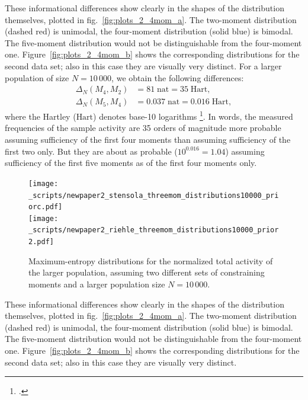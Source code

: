 \documentclass[\ifafour a4paper,12pt,\else a5paper,10pt,\fi%
onecolumn,oneside,article,%
british%
]{memoir}
\theoremstyle{remark}
\theoremstyle{innote}
\newcommand*{\citep}{\footcites}
\renewcommand*{\|}{\nonscript\,\vert\nonscript\;\mathopen{}}
\newcommand*{\sect}{\S}%
\newcommand*{\fig}{fig.}%
\newcommand*{\ydi}{\varDelta}
\newcommand*{\nat}{\textrm{nat}}
\newcommand*{\hart}{\textrm{Hart}}
\begin{document}
These informational differences show clearly in the shapes of the
distribution themselves, plotted in 
\fig~\ref{fig:plots_2_4mom_a}. The two-moment distribution
(\textcolor{myred}{dashed red}) is unimodal, the four-moment distribution
(\textcolor{myblue}{solid blue}) is bimodal. The five-moment distribution
would not be distinguishable from the four-moment one.  Figure~\ref{fig:plots_2_4mom_b} shows the corresponding distributions for the second data set;
also in this case they are visually very distinct.
For a
larger population of size $N=10\,000$, we obtain the following differences:
\begin{equation}
  \label{eq:diff_suff_N}
  \begin{split}
  \ydi_{N}(M_{4},M_{2}) &= 81\;\nat = 35\;\hart,
\\    \ydi_{N}(M_{5},M_{4}) &= 0.037\;\nat = 0.016\;\hart,
  \end{split}
\end{equation}
where the Hartley ($\hart$) denotes base-10 logarithms
\citep[\sect~C.4]{iso2009}[it was called \enquote{ban} and used by Turing
and Good in their code-breaking work at Bletchley
Park: see][]{good1985%
}[\sect~4.2]{jaynes1994_r2003}. In
words, the measured frequencies of the sample activity are 35 orders of
magnitude more probable assuming sufficiency of the first four moments than
assuming sufficiency of the first two only. But they are about as probable
($10^{0.016} = 1.04$) assuming sufficiency of the first five moments as of
the first four moments only.

\begin{figure}[!p]
\centering
\subcaption[]{\label{fig:plots_2_4mom_a}}%
\texttt{[image: \_scripts/newpaper2\_stensola\_threemom\_distributions10000\_priorc.pdf]}%
\\[2em]%
\subcaption[]{\label{fig:plots_2_4mom_b}}%
\texttt{[image: \_scripts/newpaper2\_riehle\_threemom\_distributions10000\_prior2.pdf]}%
\\[2em]%
\caption{Maximum-entropy distributions for the normalized total activity of
  the larger population, assuming two different sets of constraining moments
  and a larger population size $N=10\,000$.}
\label{fig:plots_2_4mom}
\end{figure}
These informational differences show clearly in the shapes of the
distribution themselves, plotted in 
\fig~\ref{fig:plots_2_4mom_a}. The two-moment distribution
(\textcolor{myred}{dashed red}) is unimodal, the four-moment distribution
(\textcolor{myblue}{solid blue}) is bimodal. The five-moment distribution
would not be distinguishable from the four-moment one.  Figure~\ref{fig:plots_2_4mom_b} shows the corresponding distributions for the second data set;
also in this case they are visually very distinct.
\end{document}
